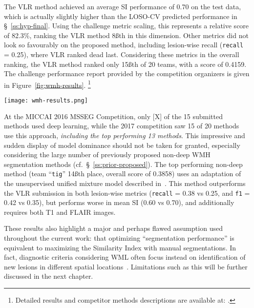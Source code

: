 The VLR method achieved an average SI performance of 0.70 on the test data,
which is actually slightly higher than the LOSO-CV predicted performance in \S~\ref{ss:hyp-final}.
Using the challenge metric scaling, this represents a relative score of 82.3\%,
ranking the VLR method 8\ss{th} in this dimension.
Other metrics did not look so favourably on the proposed method,
including lesion-wise recall (\texttt{recall} = 0.25), where VLR ranked dead last.
Considering these metrics in the overall ranking,
the VLR method ranked only 15\ss{th} of 20 teams, with a score of 0.4159.
The challenge performance report provided by the competition organizers
is given in Figure~\ref{fig:wmh-results}.%
\footnote{Detailed results and competitor methods descriptions are available at:
  .}
\par
\begin{sidewaysfigure}
    \centering
    \texttt{[image: wmh-results.png]}\\
    
    \caption{Results report for the submitted method provided by the WMH Segmentation Competition.}%
    \label{fig:wmh-results}
\end{sidewaysfigure}
At the MICCAI 2016 MSSEG Competition, only [X] of the 15 submitted methods used deep learning,
while the 2017 competition saw 15 of 20 methods use this approach,
\textit{including the top performing 13 methods}.
This impressive and sudden display of model dominance should not be taken for granted,
especially considering the large number of previously proposed non-deep WMH segmentation methods
(cf.~\S~\ref{ss:prior-proposed}).
The top performing non-deep method (team ``\texttt{tig}'' 14\ss{th} place, overall score of 0.3858)
uses an adaptation of the unsupervised unified mixture model described in~\cite{Sudre2015}.
This method outperforms the VLR submission in both lesion-wise metrics
(\texttt{recall} = 0.38 vs 0.25, and \texttt{f1} = 0.42 vs 0.35),
but performs worse in mean SI (0.60 vs 0.70), and additionally requires both T1 and FLAIR images.
\par
These results also highlight a major and perhaps flawed assumption used
throughout the current work:
that optimizing ``segmentation performance'' is equivalent to
maximizing the Similarity Index with manual segmentations.
In fact, diagnostic criteria considering WML often focus instead on
identification of new lesions in different spatial locations~\cite{Polman2011,Sorbi2012}.
Limitations such as this will be further discussed in the next chapter.

